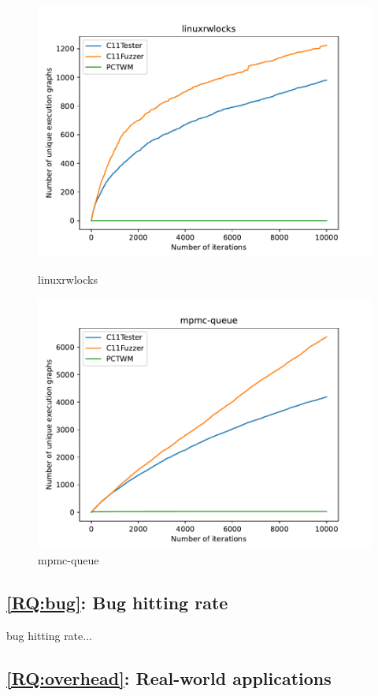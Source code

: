 \begin{figure}[H]
    \begin{minipage}{0.45\textwidth}
		\centering
		\includegraphics[width=\textwidth]{figure/pctwm/linuxrwlocks.pdf}
		\caption{linuxrwlocks}
		\label{pctwm-linuxrwlocks}
	\end{minipage}
	\hfill
	\begin{minipage}{0.45\textwidth}
		\centering
		\includegraphics[width=\textwidth]{figure/pctwm/mpmc-queue.pdf}
		\caption{mpmc-queue}
		\label{pctwm-mpmc-queue}
	\end{minipage}
	\vspace{0.5cm}

\end{figure}


\subsection{\ref*{RQ:bug}: Bug hitting rate}

bug hitting rate...
\subsection{\ref*{RQ:overhead}: Real-world applications}




